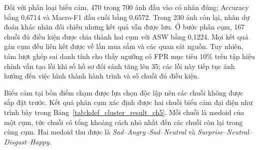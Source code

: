 \documentclass[../LuanVan.tex]{subfiles}
\begin{document}
\begin{table}[H]
    \centering
    \caption{Đánh giá hiệu quả của luồng hệ thống đầu cuối}
    \label{tab:end_to_end_effectiveness_ch5}
\end{table}

Đối với phân loại biểu cảm, 470 trong 700 ảnh đầu vào có nhãn đúng; Accuracy bằng 0,6714 và Macro-F1 đầu cuối bằng 0,6572. Trong 230 ảnh còn lại, nhãn dự đoán khác nhãn đối chiếu nhưng kết quả vẫn được lưu. Ở bước phân cụm, 167 chuỗi đủ điều kiện được chia thành hai cụm với ASW bằng 0,1224. Mọi kết quả gán cụm đều liên kết được về lần mua sắm và các quan sát nguồn. Tuy nhiên, tám lượt ghép sai danh tính cho thấy ngưỡng có FPR mục tiêu 10\% trên tập hiệu chỉnh vẫn tạo lỗi khi số hồ sơ đối sánh tăng lên 35; các lỗi này tiếp tục ảnh hưởng đến việc hình thành hành trình và số chuỗi đủ điều kiện.

Biểu cảm tại bốn điểm chạm được lựa chọn độc lập nên các chuỗi không được sắp đặt trước. Kết quả phân cụm xác định được hai chuỗi biểu cảm đại diện như trình bày trong Bảng~\ref{tab:kdef_cluster_result_ch5}. Mỗi chuỗi là medoid của một cụm, tức chuỗi có tổng khoảng cách nhỏ nhất đến các chuỗi còn lại trong cùng cụm. Hai medoid thu được là \textit{Sad--Angry--Sad--Neutral} và \textit{Surprise--Neutral--Disgust--Happy}.
\end{document}
